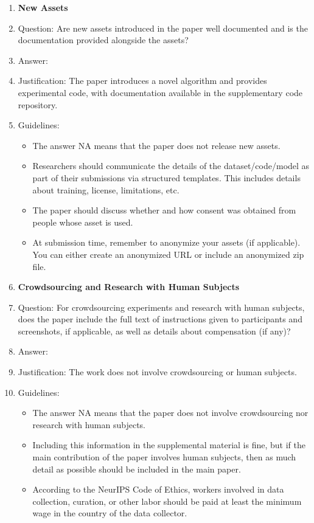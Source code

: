 \documentclass{article}
\begin{document}
\begin{enumerate}
\item {\bf New Assets}
    \item[] Question: Are new assets introduced in the paper well documented and is the documentation provided alongside the assets?
    \item[] Answer: \answerYes{}
    \item[] Justification: The paper introduces a novel algorithm and provides experimental code, with documentation available in the supplementary code repository.
    \item[] Guidelines:
    \begin{itemize}
        \item The answer NA means that the paper does not release new assets.
        \item Researchers should communicate the details of the dataset/code/model as part of their submissions via structured templates. This includes details about training, license, limitations, etc. 
        \item The paper should discuss whether and how consent was obtained from people whose asset is used.
        \item At submission time, remember to anonymize your assets (if applicable). You can either create an anonymized URL or include an anonymized zip file.
    \end{itemize}

\item {\bf Crowdsourcing and Research with Human Subjects}
    \item[] Question: For crowdsourcing experiments and research with human subjects, does the paper include the full text of instructions given to participants and screenshots, if applicable, as well as details about compensation (if any)? 
    \item[] Answer: \answerNA{}
    \item[] Justification: The work does not involve crowdsourcing or human subjects.
    \item[] Guidelines:
    \begin{itemize}
        \item The answer NA means that the paper does not involve crowdsourcing nor research with human subjects.
        \item Including this information in the supplemental material is fine, but if the main contribution of the paper involves human subjects, then as much detail as possible should be included in the main paper. 
        \item According to the NeurIPS Code of Ethics, workers involved in data collection, curation, or other labor should be paid at least the minimum wage in the country of the data collector. 
    \end{itemize}


\end{enumerate}
\end{document}
